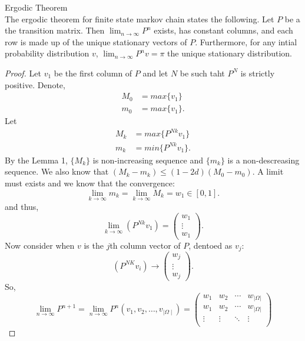 \documentclass[a4paper]{article}
\begin{document}
\begin{theorem}{Ergodic Theorem}\\
  The ergodic theorem for finite state markov chain states the following. Let $P$ be a the transition matrix. Then $\lim_{n \to \infty} P^{n}$ exists, has constant columns, and each row is made up of the unique stationary vectors of $P$. Furthermore, for any intial probability distribution $v$,  $\lim_{n \to \infty} P^{n} v = \pi $ the unique stationary distribution.\\ 

  \noindent\hrulefill

   \begin{proof}
     Let $v_1$ be the first column of $P$ and let  $N$ be such taht  $P^{N}$ is strictly positive. Denote,
     \begin{align*}
       M_0 &= max \{v_1\} \\
       m_0 &= max \{v_1\} 
     .\end{align*}
     Let
     \begin{align*}
       M_k &= max \{P^{Nk} v_1\} \\
       m_k  &= min \{P^{Nk} v_1\}  
     .\end{align*}
     By the Lemma 1, $\{M_k\} $ is non-increasing sequence and $\{m_k\} $ is a non-descreasing sequence. We also know that $\left( M_k - m_k \right) \leq (1-2d) (M_0 - m_0) $. A limit must exists and we know that the convergence:
     \[
       \lim_{k \to \infty} m_k = \lim_{k \to \infty} M_k = w_1 \in [0,1]
     .\]
     and thus,
     \[
     \lim_{k\to \infty} \left( P^{Nk} v_1 \right) = \begin{pmatrix} w_1\\ \vdots\\ w_1 \end{pmatrix} 
     .\] 
     Now consider when $v$ is the  $j$th column vector of  $P$, dentoed as  $v_j$:
      \[
        \left( P^{NK} v_i \right) \to \begin{pmatrix} w_j\\ \vdots\\ w_j \end{pmatrix}
     .\] 
     So, 
     \[
     \lim_{n\to \infty} P^{n+1} = \lim_{n\to \infty} P^{n} (v_1, v_2, \ldots, v_{\mid \Omega \mid }) =  \begin{pmatrix}
w_1 & w_2 & \cdots & w_{|\Omega|} \\
w_1 & w_2 & \cdots & w_{|\Omega|} \\
\vdots & \vdots & \ddots & \vdots \\

\end{pmatrix}\]
\end{proof}
\end{theorem}
\end{document}
